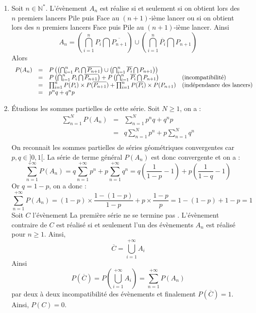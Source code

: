\documentclass[a4paper,twoside,french,10pt]{VcCours}
\begin{document}
\begin{enumerate}
\item Soit $n \in \mathbb{N}^*$. L'évènement $A_n$ est réalise si et seulement si on obtient lors des $n$ premiers lancers Pile puis Face au $(n+1)$-ième lancer ou si on  obtient lors des $n$ premiers lancers Face puis Pile au $(n+1)$-ième lancer. Ainsi 
\[ A_n = \left( \bigcap_{i=1}^n P_i \bigcap \overline{P_{n+1}} \right) \cup \left( \bigcap_{i=1}^n \overline{P_i} \bigcap P_{n+1} \right)\]
Alors 
\[ \begin{array}{llll}
P(A_n) & = & P\left(\left( \bigcap_{i=1}^n P_i \bigcap \overline{P_{n+1}} \right) \cup \left( \bigcap_{i=1}^n \overline{P_i} \bigcap P_{n+1} \right)\right) & \\
& = &  P\left(\bigcap_{i=1}^n P_i \bigcap \overline{P_{n+1}}\right) + P  \left(\bigcap_{i=1}^n \overline{P_i} \bigcap P_{n+1} \right) & \hbox{(incompatibilité)} \\
& = & \prod_{i=1}^n P(P_i) \times P( \overline{P_{n+1}}) + \prod_{i=1}^n P(\overline{P_i}) \times P( P_{n+1}) & \hbox{(indépendance des lancers)} \\
& = & p^n q + q^n p \\
\end{array} \]
\item Étudions les sommes partielles de cette série. Soit $N \geq 1$, on a :
\[ \begin{array}{ccl}
\sum_{n=1}^N P(A_n) & = & \sum_{n=1}^N p^nq + q^np \\
 & = & q \sum_{n=1}^N p^n + p \sum_{n=1}^N q^n \\
 \end{array} \]
 On reconnait les sommes partielles de séries géométriques convergentes car $p,q \in ]0,1[$. La série de terme général $P(A_n)$ est donc convergente et on a :
 \[ \sum_{n=1}^{ + \infty} P(A_n)  = q \sum_{n=1}^{+ \infty} p^n +p \sum_{n=1}^{+ \infty} q^n = q \left( \frac{1}{1-p} - 1 \right) +  p \left( \frac{1}{1-q} - 1 \right) \]
Or $q=1-p$, on a donc :
 \[   \sum_{n=1}^{ + \infty} P(A_n) = (1-p) \times \frac{1-(1-p)}{1-p} + p \times \frac{1-p}{p} = 1-(1-p)+1-p=1 \]
Soit $C$ l'évènement \og La première série ne se termine pas \fg . L'évènement contraire de $C$ est réalisé si et seulement l'un des évènements $A_n$ est réalisé pour $n \geq 1$. Ainsi,
\[ \overline{C} = \bigcup_{i=1}^{+ \infty} A_i \]
Ainsi 
$$P(\overline{C})= P \left(\bigcup_{i=1}^{+ \infty} A_i \right) = \sum_{n=1}^{+  \infty} P(A_n)$$
par deux à deux incompatibilité des évènements et finalement $P(\overline{C})=1$. Ainsi, $P(C)=0$.

\end{enumerate}
\end{document}
